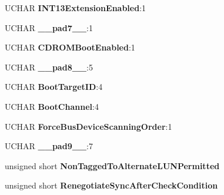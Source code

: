 \begin{DoxyCompactItemize}
U\+C\+H\+AR {\bfseries I\+N\+T13\+Extension\+Enabled}\+:1
\item 
\mbox{\label{struct_bus_logic___auto_s_c_s_i_data_a6be8e631a71d8d731aeea9e5bcc2103e}} 
U\+C\+H\+AR {\bfseries \+\_\+\+\_\+pad7\+\_\+\+\_\+}\+:1
\item 
\mbox{\label{struct_bus_logic___auto_s_c_s_i_data_ad255ce85cfff6b9fc682b9f11ef67552}} 
U\+C\+H\+AR {\bfseries C\+D\+R\+O\+M\+Boot\+Enabled}\+:1
\item 
\mbox{\label{struct_bus_logic___auto_s_c_s_i_data_aefd9b5c6993230defd36182916e82173}} 
U\+C\+H\+AR {\bfseries \+\_\+\+\_\+pad8\+\_\+\+\_\+}\+:5
\item 
\mbox{\label{struct_bus_logic___auto_s_c_s_i_data_ac5338d03a610b50a5dd6a326fef4285b}} 
U\+C\+H\+AR {\bfseries Boot\+Target\+ID}\+:4
\item 
\mbox{\label{struct_bus_logic___auto_s_c_s_i_data_a7e2b3de9e8cd0b531d177fb71990d04a}} 
U\+C\+H\+AR {\bfseries Boot\+Channel}\+:4
\item 
\mbox{\label{struct_bus_logic___auto_s_c_s_i_data_a7d6e490f4ad316b14e49e0df047c6c34}} 
U\+C\+H\+AR {\bfseries Force\+Bus\+Device\+Scanning\+Order}\+:1
\item 
\mbox{\label{struct_bus_logic___auto_s_c_s_i_data_ab7144779fa2f6fcdc211096507b39e6e}} 
U\+C\+H\+AR {\bfseries \+\_\+\+\_\+pad9\+\_\+\+\_\+}\+:7
\item 
\mbox{\label{struct_bus_logic___auto_s_c_s_i_data_af985881d991eb1d7e42afdb3cd932d2e}} 
unsigned short {\bfseries Non\+Tagged\+To\+Alternate\+L\+U\+N\+Permitted}
\item 
\mbox{\label{struct_bus_logic___auto_s_c_s_i_data_a4900ee8938e265fd00f1247a66760b34}} 
unsigned short {\bfseries Renegotiate\+Sync\+After\+Check\+Condition}
\item 
\mbox{\label{struct_bus_logic___auto_s_c_s_i_data_ac247f1d5fd91fe3ffdf3f0b6e099f701}} 

\end{DoxyCompactItemize}
